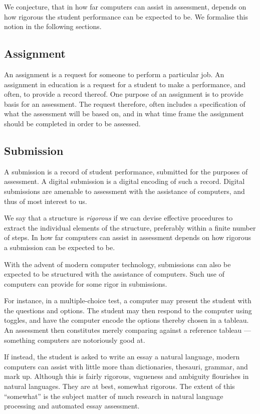 We conjecture, that in how far computers can assist in assessment, depends on
how rigorous the student performance can be expected to be.  We formalise this
notion in the following sections.

\subsection{Assignment}

An assignment is a request for someone to perform a particular job.  An
assignment in education is a request for a student to make a performance, and
often, to provide a record thereof. One purpose of an assignment is to provide
basis for an assessment. The request therefore, often includes a specification
of what the assessment will be based on, and in what time frame the assignment
should be completed in order to be assessed.

\subsection{Submission}

A submission is a record of student performance, submitted for the purposes of
assessment. A digital submission is a digital encoding of such a record.
Digital submissions are amenable to assessment with the assistance of
computers, and thus of most interest to us.

We say that a structure is \emph{rigorous} if we can devise effective
procedures to extract the individual elements of the structure, preferably
within a finite number of steps. In how far computers can assist in assessment
depends on how rigorous a submission can be expected to be.

With the advent of modern computer technology, submissions can also be expected
to be structured with the assistance of computers. Such use of computers can
provide for some rigor in submissions.

For instance, in a multiple-choice test, a computer may present the student
with the questions and options. The student may then respond to the computer
using toggles, and have the computer encode the options thereby chosen in a
tableau. An assessment then constitutes merely comparing against a reference
tableau --- something computers are notoriously good at.

If instead, the student is asked to write an essay a natural language, modern
computers can assist with little more than dictionaries, thesauri, grammar, and
mark up. Although this is fairly rigorous, vagueness and ambiguity flourishes
in natural languages. They are at best, somewhat rigorous. The extent of this
``somewhat'' is the subject matter of much research in natural language
processing and automated essay assessment\cite{valenti-et-al-2003}.

